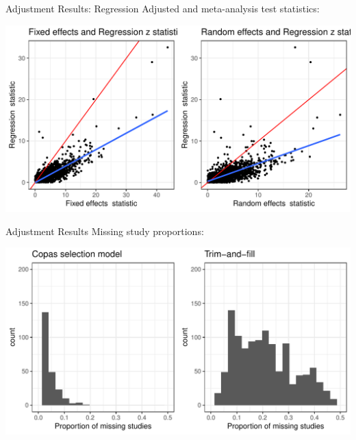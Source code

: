 \documentclass[english]{beamer}\usepackage[]{graphicx}\usepackage[]{color}
\makeatletter
\def\maxwidth{ %
  \ifdim\Gin@nat@width>\linewidth
    \linewidth
  \else
    \Gin@nat@width
  \fi
}
\newenvironment{knitrout}{}{} %
\makeatother
\begin{document}
\begin{frame}[fragile]{Adjustment Results: Regression}
Adjusted and meta-analysis test statistics:

\vspace{-3mm}
\begin{knitrout}
\color{fgcolor}
\includegraphics[width=\maxwidth]{figure/unnamed-chunk-18-1} 

\end{knitrout}
\end{frame}


\begin{frame}[fragile]{Adjustment Results}
Missing study proportions:

\vspace{-3mm}
\begin{knitrout}
\color{fgcolor}
\includegraphics[width=\maxwidth]{figure/unnamed-chunk-19-1} 

\end{knitrout}
\end{frame}
\end{document}
